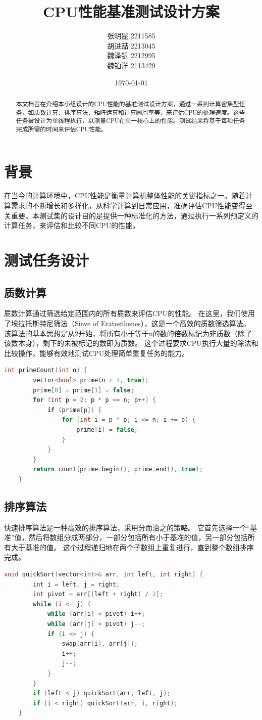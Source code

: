 \documentclass{ctexart}
\title{CPU性能基准测试设计方案}
\author{张明昆 2211585
        \\
        胡进喆 2213045
        \\
        魏泽钒 2212995
        \\
        魏铂洋 2113429
        }
\date{\today}
\begin{document}
\maketitle

\begin{abstract}
本文档旨在介绍本小组设计的CPU性能的基准测试设计方案，通过一系列计算密集型任务，如质数计算、排序算法、矩阵运算和计算圆周率等，来评估CPU的处理速度。这些任务被设计为单线程执行，以测量CPU在单一核心上的性能。测试结果将基于每项任务完成所需的时间来评估CPU性能。
\end{abstract}

\section{背景}
在当今的计算环境中，CPU性能是衡量计算机整体性能的关键指标之一。随着计算需求的不断增长和多样化，从科学计算到日常应用，准确评估CPU性能变得至关重要。本测试集的设计目的是提供一种标准化的方法，通过执行一系列预定义的计算任务，来评估和比较不同CPU的性能。

\section{测试任务设计}
\subsection{质数计算}
质数计算通过筛选给定范围内的所有质数来评估CPU的性能。
在这里，我们使用了埃拉托斯特尼筛法（Sieve of Eratosthenes），这是一个高效的质数筛选算法。
该算法的基本思想是从2开始，将所有小于等于n的数的倍数标记为非质数（除了该数本身），剩下的未被标记的数即为质数。
这个过程要求CPU执行大量的除法和比较操作，能够有效地测试CPU处理简单重复任务的能力。
\begin{lstlisting}[language=C++]
    int primeCount(int n) {
        vector<bool> prime(n + 1, true);
        prime[0] = prime[1] = false;
        for (int p = 2; p * p <= n; p++) {
            if (prime[p]) {
                for (int i = p * p; i <= n; i += p) {
                    prime[i] = false;
                }
            }
        }
        return count(prime.begin(), prime.end(), true);
    }
\end{lstlisting}
\subsection{排序算法}
快速排序算法是一种高效的排序算法，采用分而治之的策略。
它首先选择一个“基准”值，然后将数组分成两部分，一部分包括所有小于基准的值，另一部分包括所有大于基准的值。
这个过程递归地在两个子数组上重复进行，直到整个数组排序完成。
\begin{lstlisting}[language=C++]
    void quickSort(vector<int>& arr, int left, int right) {
        int i = left, j = right;
        int pivot = arr[(left + right) / 2];
        while (i <= j) {
            while (arr[i] < pivot) i++;
            while (arr[j] > pivot) j--;
            if (i <= j) {
                swap(arr[i], arr[j]);
                i++;
                j--;
            }
        }
        if (left < j) quickSort(arr, left, j);
        if (i < right) quickSort(arr, i, right);
    }
\end{lstlisting}
\end{document}
